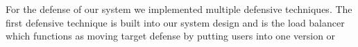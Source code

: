 For the defense of our system we implemented multiple defensive techniques. The first defensive technique is built into our system design and is the load balancer which functions as moving target defense by putting users into one version or 
